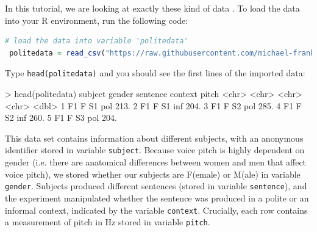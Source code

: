 \documentclass[nobib]{tufte-handout}
\newcommand{\ri}[1]{\lstinline{#1}}  %
\begin{document}
In this tutorial, we are looking at exactly these kind of data
\citep[following][]{Winter2013:Linear-models-a}. To load the data into your R environment,
run the following code:

\medskip


\begin{minipage}[]{\textwidth}
\begin{lstlisting}[language=R]
  # load the data into variable 'politedata'
 politedata = read_csv("https://raw.githubusercontent.com/michael-franke/bayes_mixed_regression_tutorial/master/code/politeness_data.csv")
\end{lstlisting}
\end{minipage}

\vspace*{-0.5cm}

\noindent Type \ri{head(politedata)} and you should see the first lines of the imported
data:

\medskip

\begin{minipage}[]{\textwidth}
\begin{rc}
> head(politedata)
   subject gender sentence context pitch
   <chr>   <chr>  <chr>    <chr>   <dbl>
 1 F1      F      S1       pol      213.
 2 F1      F      S1       inf      204.
 3 F1      F      S2       pol      285.
 4 F1      F      S2       inf      260.
 5 F1      F      S3       pol      204.
\end{rc}
\end{minipage}


\medskip

\noindent This data set contains information about different subjects, with an anonymous identifier stored in variable \texttt{subject}.
Because voice pitch is highly dependent on gender (i.e. there are anatomical differences between women and men that affect voice pitch), we stored whether our subjects are F(emale) or M(ale) in variable \texttt{gender}.
Subjects produced different sentences (stored in variable \texttt{sentence}), and the experiment manipulated whether the sentence was produced in a polite or an informal context, indicated by the variable \texttt{context}. Crucially, each row contains a measurement of pitch in Hz stored in variable \texttt{pitch}.
\end{document}
